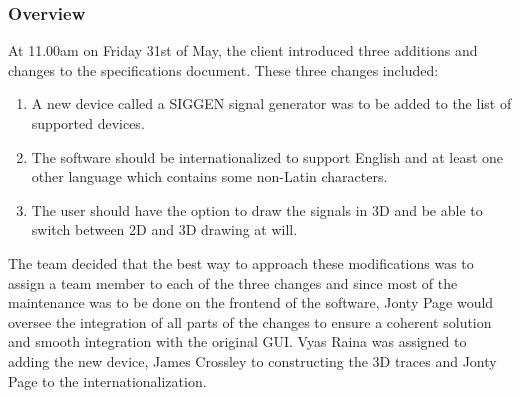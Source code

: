 \documentclass{article}					%
\begin{document}
\subsubsection{Overview}
At 11.00am on Friday 31st of May, the client introduced three additions and changes to the specifications document. These three changes included:
\begin{enumerate}
  \item A new device called a SIGGEN signal generator was to be added to the list of supported devices.
  \item The software should be internationalized to support English and at least one other language which contains some non-Latin characters.
  \item The user should have the option to draw the signals in 3D and be able to switch between 2D and 3D drawing at will.
\end{enumerate}
The team decided that the best way to approach these modifications was to assign a team member to each of the three changes and since most of the maintenance was to be done on the frontend of the software, Jonty Page would oversee the integration of all parts of the changes to ensure a coherent solution and smooth integration with the original GUI. Vyas Raina was assigned to adding the new device, James Crossley to constructing the 3D traces and Jonty Page to the internationalization.
\end{document}
